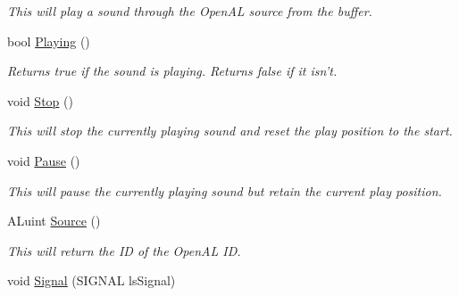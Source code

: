 \begin{DoxyCompactItemize}
\begin{DoxyCompactList}\small\item\em This will play a sound through the OpenAL source from the buffer. \end{DoxyCompactList}\item 
\hypertarget{classc_audio_object_a24febfe7f9dce25d0580ab1d7f0a31de}{
bool \hyperlink{classc_audio_object_a24febfe7f9dce25d0580ab1d7f0a31de}{Playing} ()}
\label{classc_audio_object_a24febfe7f9dce25d0580ab1d7f0a31de}

\begin{DoxyCompactList}\small\item\em Returns true if the sound is playing. Returns false if it isn't. \end{DoxyCompactList}\item 
\hypertarget{classc_audio_object_a9d4746cc93eec70bb92e897c3bd52bf0}{
void \hyperlink{classc_audio_object_a9d4746cc93eec70bb92e897c3bd52bf0}{Stop} ()}
\label{classc_audio_object_a9d4746cc93eec70bb92e897c3bd52bf0}

\begin{DoxyCompactList}\small\item\em This will stop the currently playing sound and reset the play position to the start. \end{DoxyCompactList}\item 
\hypertarget{classc_audio_object_a235be455b5cb947b3b680933fd46f144}{
void \hyperlink{classc_audio_object_a235be455b5cb947b3b680933fd46f144}{Pause} ()}
\label{classc_audio_object_a235be455b5cb947b3b680933fd46f144}

\begin{DoxyCompactList}\small\item\em This will pause the currently playing sound but retain the current play position. \end{DoxyCompactList}\item 
\hypertarget{classc_audio_object_adb134027851226f2f5a446a3d885f26e}{
ALuint \hyperlink{classc_audio_object_adb134027851226f2f5a446a3d885f26e}{Source} ()}
\label{classc_audio_object_adb134027851226f2f5a446a3d885f26e}

\begin{DoxyCompactList}\small\item\em This will return the ID of the OpenAL ID. \end{DoxyCompactList}\item 
\hypertarget{classc_audio_object_af4c4aca8962158ec17809409ca330188}{
void \hyperlink{classc_audio_object_af4c4aca8962158ec17809409ca330188}{Signal} (SIGNAL lsSignal)}
\label{classc_audio_object_af4c4aca8962158ec17809409ca330188}


\end{DoxyCompactItemize}
